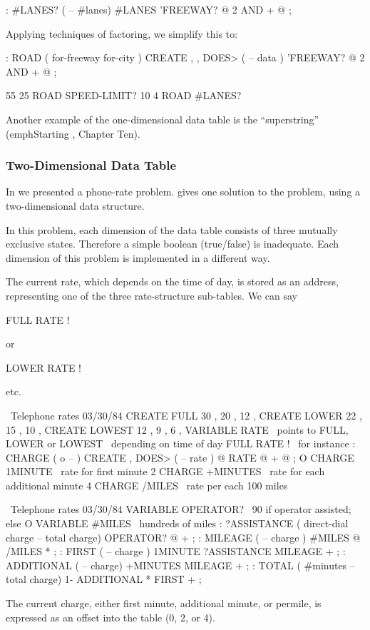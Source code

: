 \begin{Code}
: #LANES?  ( -- #lanes)
     #LANES  'FREEWAY? @  2 AND  +  @ ;
\end{Code}
Applying techniques of factoring, we simplify this to:

\begin{Code}
: ROAD  ( for-freeway for-city ) CREATE , ,
     DOES> ( -- data )  'FREEWAY? @  2 AND  +  @ ;

55 25 ROAD SPEED-LIMIT?
10  4 ROAD #LANES?
\end{Code}
Another example of the one-dimensional data table is the ``superstring''
(emph{Starting \Forth{}}, Chapter Ten).

\subsubsection{Two-Dimensional Data Table}
In  we presented a phone-rate problem.  gives one
solution to the problem, using a two-dimensional data structure.

In this problem, each dimension of the data table consists of three
mutually exclusive states. Therefore a simple boolean (true/false) is
inadequate. Each dimension of this problem is implemented in a different
way.

The current rate, which depends on the time of day, is stored as an
address, representing one of the three rate-structure sub-tables. We can
say
\begin{Code}
FULL RATE !
\end{Code}
or
\begin{Code}
LOWER RATE !
\end{Code}
etc.

\begin{figure*}[tttt]
\begin{Screen}
\ Telephone rates                                   03/30/84
CREATE FULL     30 , 20 , 12 ,
CREATE LOWER    22 , 15 , 10 ,
CREATE LOWEST   12 ,  9 ,  6 ,
VARIABLE RATE   \ points to FULL, LOWER or LOWEST
                \ depending on time of day
FULL RATE !  \ for instance
: CHARGE   ( o -- ) CREATE ,
   DOES>  ( -- rate )  @  RATE @ +  @ ;
O CHARGE 1MINUTE   \ rate for first minute
2 CHARGE +MINUTES  \ rate for each additional minute
4 CHARGE /MILES    \ rate per each 100 miles
\end{Screen}

\begin{Screen}
\ Telephone rates                                   03/30/84
VARIABLE OPERATOR?  \ 90 if operator assisted; else O
VARIABLE #MILES  \ hundreds of miles
: ?ASSISTANCE  ( direct-dial charge -- total charge)
   OPERATOR? @  + ;
: MILEAGE  ( -- charge )  #MILES @  /MILES * ;
: FIRST  ( -- charge )  1MINUTE  ?ASSISTANCE  MILEAGE + ;
: ADDITIONAL  ( -- charge)  +MINUTES  MILEAGE + ;
: TOTAL ( #minutes -- total charge)
   1- ADDITIONAL *  FIRST + ;
\end{Screen}
\end{figure*}
The current charge, either first minute, additional minute, or permile,
is expressed as an offset into the table (0, 2, or 4).


